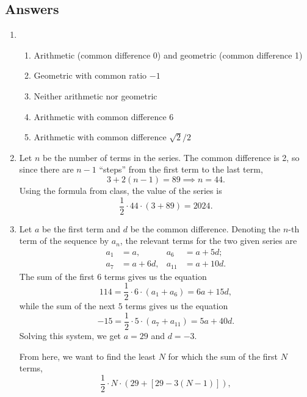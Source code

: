 \newpage
\subsection{Answers}

\begin{enumerate}
\item \begin{enumerate}
\item Arithmetic (common difference 0) and geometric (common difference 1)
\item Geometric with common ratio $-1$
\item Neither arithmetic nor geometric
\item Arithmetic with common difference 6
\item Arithmetic with common difference $\sqrt{2}/2$
\end{enumerate}
\item Let $n$ be the number of terms in the series. The common difference is 2, so since there are $n - 1$ ``steps'' from the first term to the last term,
\begin{equation*}
3 + 2(n - 1) = 89\implies n = 44.
\end{equation*}
Using the formula from class, the value of the series is 
\begin{equation*}
\frac{1}{2}\cdot 44\cdot (3 + 89) = \boxed{2024}.
\end{equation*}
\item Let $a$ be the first term and $d$ be the common difference. Denoting the $n$-th term of the sequence by $a_n$, the relevant terms for the two given series are
\begin{align*}
a_1 &= a, & a_6 &= a + 5d; \\
a_7 &= a + 6d, & a_{11} &= a + 10d.
\end{align*}
The sum of the first $6$ terms gives us the equation
\begin{equation*}
114 = \frac{1}{2}\cdot 6\cdot (a_1 + a_6) = 6a + 15d,
\end{equation*}
while the sum of the next $5$ terms gives us the equation 
\begin{equation*}
-15 = \frac{1}{2}\cdot 5\cdot (a_7 + a_{11}) = 5a + 40d.
\end{equation*}
Solving this system, we get $a = 29$ and $d = -3$.\par 
From here, we want to find the least $N$ for which the sum of the first $N$ terms,
\begin{equation*}
\frac{1}{2}\cdot N\cdot (29 + [29 - 3(N - 1)]),

\end{equation*}
\end{enumerate}

